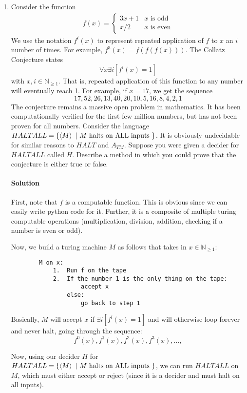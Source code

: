 \documentclass[11pt]{article}
\newcommand{\solution}[1]{\paragraph{Solution}  }
\begin{document}
\begin{enumerate}
    \item Consider the function \begin{align}
        f(x) = \begin{cases}3x+1 & x\text{ is odd}\\x/2&x\text{ is even}\end{cases}
    \end{align}
    We use the notation $f^i(x)$ to represent repeated application of $f$ to $x$ an $i$ number of times. For example, $f^3(x) = f(f(f(x)))$. The Collatz Conjecture states $$\forall x \exists i [f^i(x) = 1]$$ with $x,i \in \mathbb{N}_{\geq 1}$. That is, repeated application of this function to any number will eventually reach 1. For example, if $x=17$, we get the sequence $$17,52,26,13,40,20,10,5,16,8,4,2,1$$ The conjecture remains a massive open problem in mathematics. It has been computationally verified for the first few million numbers, but has not been proven for all numbers. Consider the language $HALTALL = \{\braket{M}~|~ M \text{ halts on ALL inputs }\}$. It is obviously undecidable for similar reasons to $HALT$ and $A_{TM}$. Suppose you were given a decider for $HALTALL$ called $H$. Describe a method in which you could prove that the conjecture is either true or false.

    \solution{} First, note that $f$ is a computable function. This is obvious since we can easily write python code for it. Further, it is a composite of multiple turing computable operations (multiplication, division, addition, checking if a number is even or odd).

    Now, we build a turing machine $M$ as follows that takes in $x \in \mathbb{N}_{\geq 1}$:

    \begin{verbatim}
        M on x:
            1.  Run f on the tape
            2.  If the number 1 is the only thing on the tape:
                    accept x
                else:
                    go back to step 1
    \end{verbatim}

    Basically, $M$ will accept $x$ if $\exists i [f^i(x) = 1]$ and will otherwise loop forever and never halt, going through the sequence:
    $$ f^0(x),f^1(x),f^2(x),f^3(x),\dots, $$

    Now, using our decider $H$ for $HALTALL =  \{\braket{M}~|~ M \text{ halts on ALL inputs }\}$, we can run $HALTALL$ on $M$, which must either accept or reject (since it is a decider and must halt on all inputs).


\end{enumerate}
\end{document}
